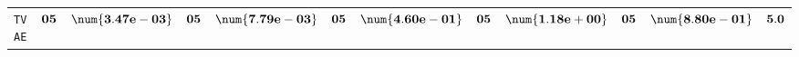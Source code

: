 \begin{xltabular}{\textwidth}{l||cC|cC|cC|cC|cC||c}
	\texttt{TVAE} & $\bf 05$ & $\bf \num{3.47e-03}$ & $\bf 05$ & $\bf \num{7.79e-03}$ & $\bf 05$ & $\bf \num{4.60e-01}$ & $\bf 05$ & $\bf \num{1.18e+00}$ & $\bf 05$ & $\bf \num{8.80e-01}$ & $\bf 5.0$  \\
\end{xltabular}
